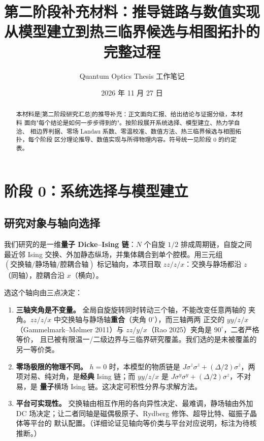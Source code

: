\documentclass[UTF8,11pt,a4paper]{ctexart}
\title{第二阶段补充材料：推导链路与数值实现\\[0.4em]
\large 从模型建立到热三临界候选与相图拓扑的完整过程}
\author{Quantum Optics Thesis 工作笔记}
\date{2026 年 11 月 27 日}
\begin{document}
\maketitle

\begin{abstract}
本材料是[第二阶段研究汇总]的推导补充：正文面向汇报、给出结论与证据分级，本材料
面向"每个结论是如何一步步得到的"。按阶段展开系统选择、模型建立、热力学自洽、
相边界判据、零场 Landau 系数、零温校准、数值方法、热三临界候选与相图拓扑，每个阶段
区分理论推导、数值实现与所得物理内容。符号统一见阶段 0 的约定表。
\end{abstract}

\section{阶段 0：系统选择与模型建立}

\subsection{研究对象与轴向选择}

我们研究的是一维\textbf{量子 Dicke--Ising 链}：$N$ 个自旋 $1/2$ 排成周期链，自旋之间
最近邻 Ising 交换、外加静态纵场，并集体耦合到单个腔模。用三元组
$(\text{交换轴}/\text{静场轴}/\text{腔耦合轴})$ 标记轴向，本项目取
\textbf{$zz/z/x$}：交换与静场都沿 $z$（同轴），腔耦合沿 $x$（横向）。

选这个轴向由三点决定：

\begin{enumerate}
  \item \textbf{三轴夹角是不变量。} 全局自旋旋转同时转动三个轴，不能改变任意两轴的
        夹角。$zz/z/x$ 中交换轴与静场轴\textbf{重合}（夹角 $0^\circ$），而三轴两两
        正交的 $yy/z/x$（Gammelmark--Mølmer 2011）\cite{Gammelmark2011Thermal}与
        $zz/y/x$（Rao 2025）\cite{Rao2025Unilateral}夹角是 $90^\circ$，二者严格等价，
        且已被有限温一/二级边界与三临界研究覆盖。我们选的是未被覆盖的另一等价类。
  \item \textbf{零场极限的物理不同。} $h=0$ 时，本模型的物质链是
        $J\sigma^z\sigma^z+(\Delta/2)\sigma^z$，两项对易、纯对角，是\textbf{经典}
        Ising 链；而 $yy/z/x$ 是 $J\sigma^y\sigma^y+(\Delta/2)\sigma^z$，不对易，是
        \textbf{量子}横场 Ising 链。这决定可积性分界与求解方法。
  \item \textbf{平台可实现性。} 交换轴由相互作用的各向异性决定、最难调，静场轴由外加
        DC 场决定；让二者同轴是磁偶极原子、Rydberg 修饰、超导比特、磁振子晶体等平台的
        默认配置。（详细论证见轴向等价类与平台对应说明，标注为待核推断。）
\end{enumerate}
\end{document}
